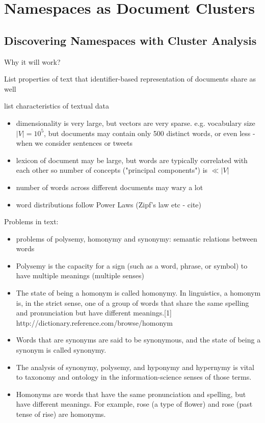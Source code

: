 \section{Namespaces as Document Clusters}


\subsection{Discovering Namespaces with Cluster Analysis}

Why it will work?

List properties of text that identifier-based representation of documents share as well

list characteristics of textual data



\begin{itemize}
  \item dimensionality is very large, but vectors are very sparse.
    e.g. vocabulary size $| V | = 10^5$, but documents may contain only 500 distinct words,
    or even less - when we consider sentences or tweets
  \item lexicon of document may be large, but words are typically correlated with each other
    so number of concepts ("principal components") is $\ll | V |$
  \item number of words across different documents may wary a lot
  \item word distributions follow Power Laws (Zipf's law etc - cite)
\end{itemize}

Problems in text:

\begin{itemize}
  \item problems of polysemy, homonymy and synonymy: semantic relations between words
  \item Polysemy is the capacity for a sign (such as a word, phrase, or symbol) to have multiple meanings (multiple senses)
  \item The state of being a homonym is called homonymy. In linguistics, a homonym is, in the strict sense, one of a group of words that share the same spelling and pronunciation but have different meanings.[1] http://dictionary.reference.com/browse/homonym
  \item Words that are synonyms are said to be synonymous, and the state of being a synonym is called synonymy.
  \item The analysis of synonymy, polysemy, and hyponymy and hypernymy is vital to taxonomy and ontology in the information-science senses of those terms.
  \item Homonyms are words that have the same pronunciation and spelling, but have different meanings. For example, rose (a type of flower) and rose (past tense of rise) are homonyms.
\end{itemize}

